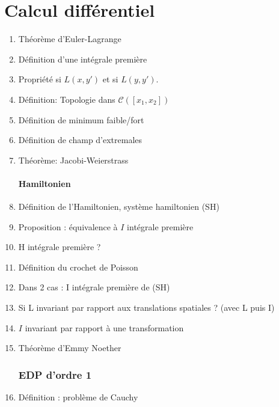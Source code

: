 \documentclass{article}
\begin{document}
\part{Calcul différentiel}
\begin{enumerate}
\section{Calcul variationnel}
\subsection{Euler-Lagrange}
	\item Théorème d'Euler-Lagrange
	\item Définition d'une intégrale première
	\item Propriété si $L(x,y')$ et si $L(y,y')$.
	\item Définition: Topologie dans $\mathcal{C}([x_1 , x_2])$
	\item Définition de minimum faible/fort
	\item Définition de champ d'extremales
	\item Théorème: Jacobi-Weierstrass
\subsection{Hamiltonien}
	\item Définition de l'Hamiltonien, système hamiltonien (SH)
	\item Proposition : équivalence à $I$ intégrale première
	\item H intégrale première ?
	\item Définition du crochet de Poisson
	\item Dans 2 cas : I intégrale première de (SH)
	\item Si L invariant par rapport aux translations spatiales ? (avec L puis I)
	\item $I$ invariant par rapport à une transformation
	\item Théorème d'Emmy Noether
\section{EDP d'ordre 1}
	\item Définition : problème de Cauchy
\end{enumerate}
\end{document}
